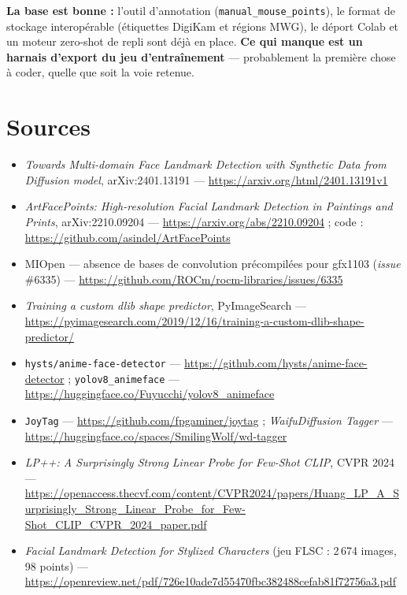 \documentclass[11pt,a4paper]{article}
\newcommand{\aretenir}[1]{%
  \par\medskip
  \noindent\colorbox{encadre}{%
    \begin{minipage}{\dimexpr\linewidth-2\fboxsep}
      \vspace{2pt}#1\vspace{2pt}
    \end{minipage}}%
  \par\medskip
}
\begin{document}
\aretenir{\textbf{La base est bonne :} l'outil d'annotation
(\texttt{manual\_mouse\_points}), le format de stockage interopérable
(étiquettes DigiKam et régions MWG), le déport Colab et un moteur zero-shot de
repli sont déjà en place. \textbf{Ce qui manque est un harnais d'export du jeu
d'entraînement} — probablement la première chose à coder, quelle que soit la voie
retenue.}

\section*{Sources}

\small\raggedright
\begin{itemize}[leftmargin=*,itemsep=2pt]
  \item \emph{Towards Multi-domain Face Landmark Detection with Synthetic Data
  from Diffusion model}, arXiv:2401.13191 —
  \url{https://arxiv.org/html/2401.13191v1}
  \item \emph{ArtFacePoints: High-resolution Facial Landmark Detection in
  Paintings and Prints}, arXiv:2210.09204 —
  \url{https://arxiv.org/abs/2210.09204} ;
  code : \url{https://github.com/asindel/ArtFacePoints}
  \item MIOpen — absence de bases de convolution précompilées pour gfx1103
  (\emph{issue} \#6335) —
  \url{https://github.com/ROCm/rocm-libraries/issues/6335}
  \item \emph{Training a custom dlib shape predictor}, PyImageSearch —
  \url{https://pyimagesearch.com/2019/12/16/training-a-custom-dlib-shape-predictor/}
  \item \texttt{hysts/anime-face-detector} —
  \url{https://github.com/hysts/anime-face-detector} ;
  \texttt{yolov8\_animeface} —
  \url{https://huggingface.co/Fuyucchi/yolov8_animeface}
  \item \texttt{JoyTag} — \url{https://github.com/fpgaminer/joytag} ;
  \emph{WaifuDiffusion Tagger} —
  \url{https://huggingface.co/spaces/SmilingWolf/wd-tagger}
  \item \emph{LP++: A Surprisingly Strong Linear Probe for Few-Shot CLIP},
  CVPR 2024 —
  \url{https://openaccess.thecvf.com/content/CVPR2024/papers/Huang_LP_A_Surprisingly_Strong_Linear_Probe_for_Few-Shot_CLIP_CVPR_2024_paper.pdf}
  \item \emph{Facial Landmark Detection for Stylized Characters} (jeu FLSC :
  2\,674 images, 98 points) —
  \url{https://openreview.net/pdf/726e10ade7d55470fbc382488cefab81f72756a3.pdf}
\end{itemize}
\end{document}
